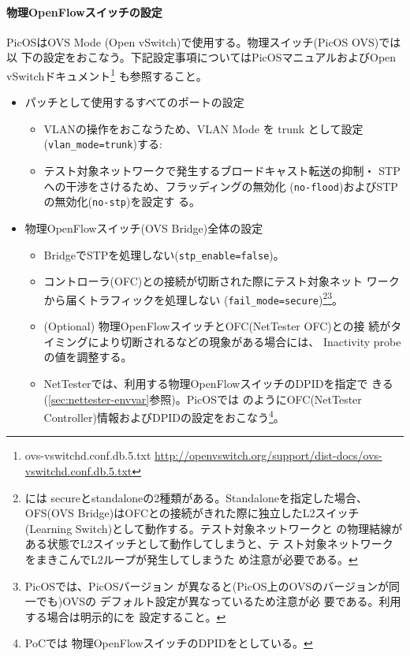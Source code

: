     \paragraph{物理OpenFlowスイッチの設定}
PicOSはOVS Mode (Open vSwitch)で使用する。物理スイッチ(PicOS OVS)では以
下の設定をおこなう。下記設定事項についてはPicOSマニュアルおよびOpen
vSwitchドキュメント\footnote{ovs-vswitchd.conf.db.5.txt
\url{http://openvswitch.org/support/dist-docs/ovs-vswitchd.conf.db.5.txt}}
も参照すること。
\begin{itemize}
 \item パッチとして使用するすべてのポートの設定~\cite{l1pjtech}
       \begin{itemize}
        \item VLANの操作をおこなうため、VLAN Mode を trunk として設定
              (\verb|vlan_mode=trunk|)する:
        \item テスト対象ネットワークで発生するブロードキャスト転送の抑制・
              STPへの干渉をさけるため、フラッディングの無効化
              (\verb|no-flood|)およびSTPの無効化(\verb|no-stp|)を設定す
              る。
       \end{itemize}
 \item 物理OpenFlowスイッチ(OVS Bridge)全体の設定
       \begin{itemize}
        \item BridgeでSTPを処理しない(\verb|stp_enable=false|)。
        \item コントローラ(OFC)との接続が切断された際にテスト対象ネット
              ワークから届くトラフィックを処理しない
              (\verb|fail_mode=secure|)\footnote{には
              secureとstandaloneの2種類がある。Standaloneを指定した場合、
              OFS(OVS Bridge)はOFCとの接続がきれた際に独立したL2スイッチ
              (Learning Switch)として動作する。テスト対象ネットワークと
              の物理結線がある状態でL2スイッチとして動作してしまうと、テ
              スト対象ネットワークをまきこんでL2ループが発生してしまうた
              め注意が必要である。}\footnote{PicOSでは、PicOSバージョン
              が異なると(PicOS上のOVSのバージョンが同一でも)OVSの
              デフォルト設定が異なっているため注意が必
              要である。利用する場合は明示的にを
              設定すること。}。
        \item (Optional) 物理OpenFlowスイッチとOFC(NetTester OFC)との接
              続がタイミングにより切断されるなどの現象がある場合には、
              Inactivity probe の値を調整する。
        \item NetTesterでは、利用する物理OpenFlowスイッチのDPIDを指定で
              きる(\ref{sec:nettester-envvar}参照)。PicOSでは
              のようにOFC(NetTester
              Controller)情報およびDPIDの設定をおこなう\footnote{PoCでは
              物理OpenFlowスイッチのDPIDをとしている。}。
       \end{itemize}
\end{itemize}

